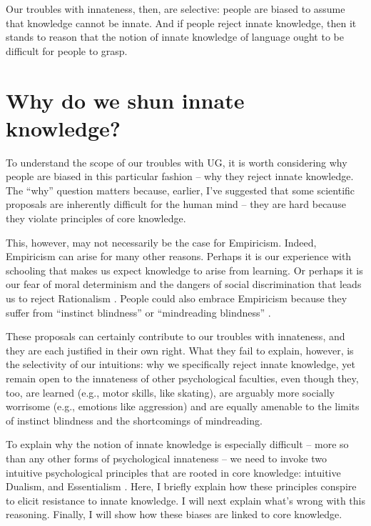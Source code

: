\documentclass[output=paper,colorlinks,citecolor=brown
]{langscibook}
\begin{document}
Our troubles with innateness, then, are selective: people are biased to assume that knowledge cannot be innate. And if people reject innate knowledge, then it stands to reason that the notion of innate knowledge of language ought to be difficult for people to grasp.

\section{Why do we shun innate knowledge?}\largerpage

To understand the scope of our troubles with UG, it is worth considering why people are biased in this particular fashion -- why they reject innate knowledge. The ``why'' question matters because, earlier, I’ve suggested that some scientific proposals are inherently difficult for the human mind -- they are hard because they violate principles of core knowledge.

This, however, may not necessarily be the case for Empiricism. Indeed, Empiricism can arise for many other reasons. Perhaps it is our experience with schooling that makes us expect knowledge to arise from learning. Or perhaps it is our fear of moral determinism and the dangers of social discrimination that leads us to reject Rationalism \citep{pinker2004blank}. People could also embrace Empiricism because they suffer from ``instinct blindness'' \citep{cosmides1994origins} or ``mindreading blindness'' \citep{carruthers2020mindreading}.

These proposals can certainly contribute to our troubles with innateness, and they are each justified in their own right. What they fail to explain, however, is the selectivity of our intuitions: why we specifically reject innate knowledge, yet remain open to the innateness of other psychological faculties, even though they, too, are learned (e.g., motor skills, like skating), are arguably more socially worrisome (e.g., emotions like aggression) and are equally amenable to the limits of instinct blindness and the shortcomings of mindreading.  

To explain why the notion of innate knowledge is especially difficult -- more so than any other forms of psychological innateness -- we need to invoke two intuitive psychological principles that are rooted in core knowledge: intuitive Dualism, and Essentialism \citep{berent2020blind,berent2021canwe}. Here, I briefly explain how these principles conspire to elicit resistance to innate knowledge. I will next explain what’s wrong with this reasoning. Finally, I will show how these biases are linked to core knowledge.
\end{document}
